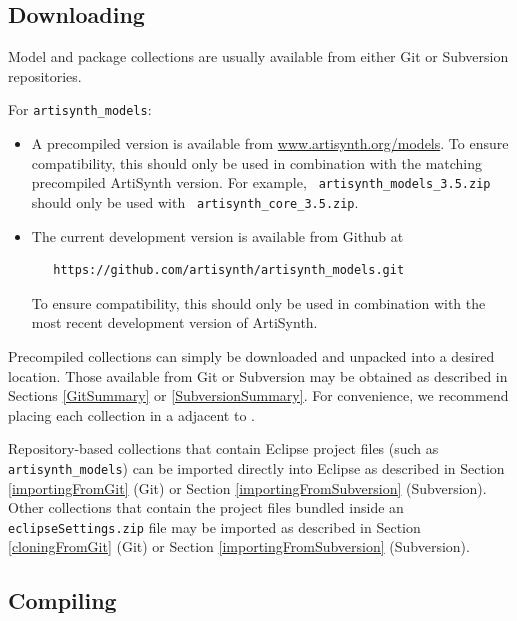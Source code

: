 \subsection{Downloading}
\label{DownloadingCollections}

Model and package collections are usually available from either Git or
Subversion repositories. 

For {\tt artisynth\_models}:

\begin{itemize}

\item A precompiled version is available
from \href{https://www.artisynth.org/models}{www.artisynth.org/models}.
To ensure compatibility, this should only be used in combination with
the matching precompiled ArtiSynth version. For example, {\tt
artisynth\_models\_3.5.zip} should only be used with {\tt
artisynth\_core\_3.5.zip}.

\item The current development version is available
from Github at
\begin{verbatim}
   https://github.com/artisynth/artisynth_models.git
\end{verbatim}
To ensure compatibility, this should only be used in combination with
the most recent development version of ArtiSynth.

\end{itemize}

Precompiled collections can simply be downloaded and unpacked into a
desired location. Those available from Git or Subversion may be
obtained as described in Sections \ref{GitSummary}
or \ref{SubversionSummary}.  For convenience, we recommend placing
each collection in a \directory{} adjacent to \ArtHome[].

Repository-based collections that contain Eclipse project files (such
as {\tt artisynth\_models}) can be imported directly into Eclipse as
described in Section \ref{importingFromGit} (Git) or
Section \ref{importingFromSubversion} (Subversion).  Other collections
that contain the project files bundled inside an {\tt
eclipseSettings.zip} file may be imported as described in
Section \ref{cloningFromGit} (Git) or
Section \ref{importingFromSubversion} (Subversion).

\subsection{Compiling}
\label{CompilingCollections}

